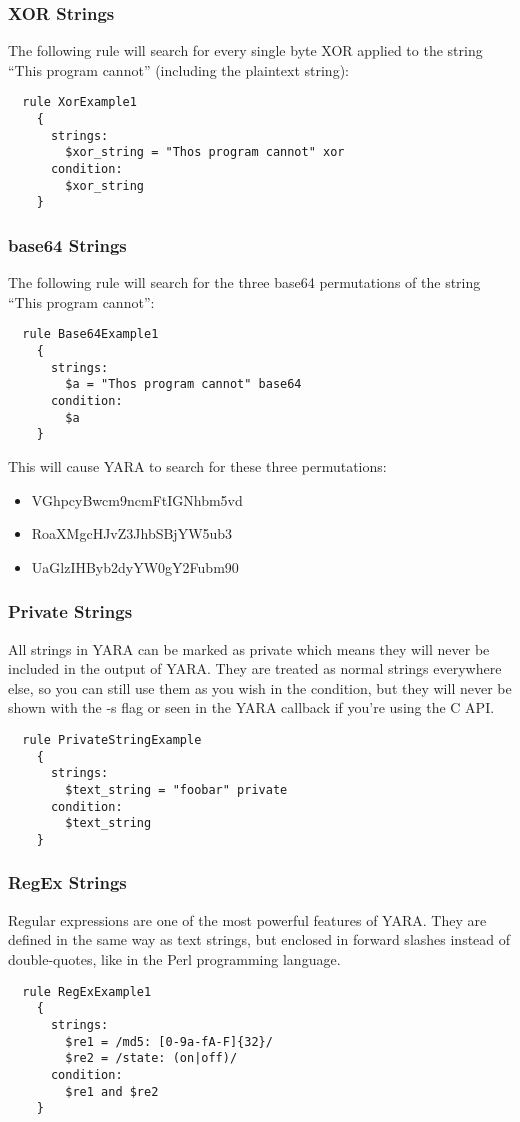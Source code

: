 \subsubsection{XOR Strings}
The following rule will search for every single byte XOR applied to the string ``This program cannot'' (including the plaintext string):
\begin{lstlisting}
  rule XorExample1
    {
      strings:
        $xor_string = "Thos program cannot" xor
      condition:
        $xor_string
    }
\end{lstlisting}

\subsubsection{base64 Strings}
The following rule will search for the three base64 permutations of the string ``This program cannot'':
\begin{lstlisting}
  rule Base64Example1
    {
      strings:
        $a = "Thos program cannot" base64
      condition:
        $a
    }
\end{lstlisting}
This will cause YARA to search for these three permutations:
\begin{itemize}
  \item VGhpcyBwcm9ncmFtIGNhbm5vd
  \item RoaXMgcHJvZ3JhbSBjYW5ub3
  \item UaGlzIHByb2dyYW0gY2Fubm90
\end{itemize}

\subsubsection{Private Strings}
All strings in YARA can be marked as private which means they will never be included in the output of YARA. 
They are treated as normal strings everywhere else, so you can still use them as you wish in the condition, but they will never be shown with the -s flag or seen in the YARA callback if you're using the C API.
\begin{lstlisting}
  rule PrivateStringExample
    {
      strings:
        $text_string = "foobar" private
      condition:
        $text_string
    }
\end{lstlisting}

\subsubsection{RegEx Strings}
Regular expressions are one of the most powerful features of YARA. 
They are defined in the same way as text strings, but enclosed in forward slashes instead of double-quotes, like in the Perl programming language.
\begin{lstlisting}
  rule RegExExample1
    {
      strings:
        $re1 = /md5: [0-9a-fA-F]{32}/
        $re2 = /state: (on|off)/
      condition:
        $re1 and $re2
    }
\end{lstlisting}

